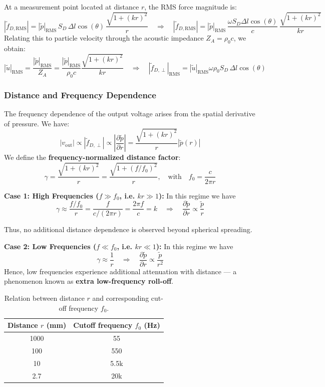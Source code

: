 At a measurement point located at distance \( r \), the RMS force magnitude is:
\[
|\tilde{f}_{D,\text{RMS}}| = |\tilde{p}|_{\text{RMS}} \, S_D \, \Delta l \cos(\theta) \, \frac{\sqrt{1 + (k r)^2}}{r}
\quad \Rightarrow \quad |\tilde{f}_{D,\text{RMS}}| = |\tilde{p}|_{\text{RMS}} \, \frac{\omega S_D \Delta l \cos(\theta)}{c} \, \frac{\sqrt{1 + (k r)^2}}{k r}
\]
Relating this to particle velocity through the acoustic impedance \( Z_A = \rho_0 c \), we obtain:
\[
|\tilde{u}|_{\text{RMS}} = \frac{|\tilde{p}|_{\text{RMS}}}{Z_A} = \frac{|\tilde{p}|_{\text{RMS}}}{\rho_0 c}\frac{\sqrt{1 + (kr)^2}}{kr}
\quad \Rightarrow \quad
|\tilde{f}_{D,\perp}|_{\text{RMS}} = |\tilde{u}|_{\text{RMS}} \omega \rho_0 S_D \, \Delta l \cos(\theta)
\]

\subsubsection{Distance and Frequency Dependence}

The frequency dependence of the output voltage arises from the spatial derivative of pressure.  
We have:
\[
|v_{\text{out}}| \propto |\tilde{f}_{D,\perp}| \propto \left| \frac{\partial \tilde{p}}{\partial r} \right| = \frac{\sqrt{1 + (k r)^2}}{r} |\tilde{p}(r)|
\]
We define the \textbf{frequency-normalized distance factor}:
\[
\gamma = \frac{\sqrt{1 + (k r)^2}}{r} = \frac{\sqrt{1 + (f / f_0)^2}}{r}, \quad \text{with} \quad f_0 = \frac{c}{2 \pi r}
\]

\textbf{Case 1: High Frequencies (\( f \gg f_0 \), i.e. \( k r \gg 1 \)):} In this regime we have
\[
\gamma \approx \frac{f / f_0}{r} = \frac{f}{c / (2\pi r)} = \frac{2\pi f}{c} = k
\quad \Rightarrow \quad \frac{\partial \tilde{p}}{\partial r} \propto \frac{\tilde{p}}{r}
\]

Thus, no additional distance dependence is observed beyond spherical spreading.

\textbf{Case 2: Low Frequencies (\( f \ll f_0 \), i.e. \( k r \ll 1 \)): } In this regime we have
\[
\gamma \approx \frac{1}{r}
\quad \Rightarrow \quad \frac{\partial \tilde{p}}{\partial r} \propto \frac{\tilde{p}}{r^2}
\]
Hence, low frequencies experience additional attenuation with distance — a phenomenon known as \textbf{extra low-frequency roll-off}.

\begin{table}[H]
\centering
\caption{Relation between distance $r$ and corresponding cut-off frequency $f_0$.}
\begin{tabular}{|c|c|}
\hline
\textbf{Distance $r$ (mm)} & \textbf{Cutoff frequency $f_0$ (Hz)} \\
\hline
1000 & 55 \\
100 & 550 \\
10 & 5.5k \\
2.7 & 20k \\
\hline
\end{tabular}
\end{table}

